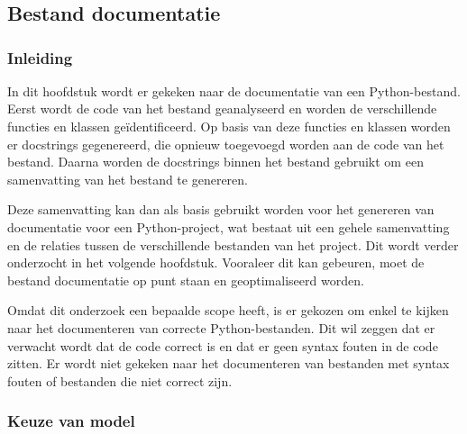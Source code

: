 \chapter{}%
\label{ch:resultaten}

\section{Bestand documentatie}
\label{sec:bestanddocumentatie}

\subsection{Inleiding}
\label{sec:bestanddocumentatie-inleiding}
In dit hoofdstuk wordt er gekeken naar de documentatie van een Python-bestand.
Eerst wordt de code van het bestand geanalyseerd en worden de verschillende functies en klassen geïdentificeerd.
Op basis van deze functies en klassen worden er docstrings gegenereerd, die opnieuw toegevoegd worden aan de code van het bestand.
Daarna worden de docstrings binnen het bestand gebruikt om een samenvatting van het bestand te genereren.

Deze samenvatting kan dan als basis gebruikt worden voor het genereren van documentatie voor een Python-project, wat bestaat uit een gehele samenvatting en de relaties tussen de verschillende bestanden van het project.
Dit wordt verder onderzocht in het volgende hoofdstuk.
Vooraleer dit kan gebeuren, moet de bestand documentatie op punt staan en geoptimaliseerd worden.

Omdat dit onderzoek een bepaalde scope heeft, is er gekozen om enkel te kijken naar het documenteren van correcte Python-bestanden.
Dit wil zeggen dat er verwacht wordt dat de code correct is en dat er geen syntax fouten in de code zitten.
Er wordt niet gekeken naar het documenteren van bestanden met syntax fouten of bestanden die niet correct zijn.

\subsection{Keuze van model}
\label{sec:bestanddocumentatie-model}

